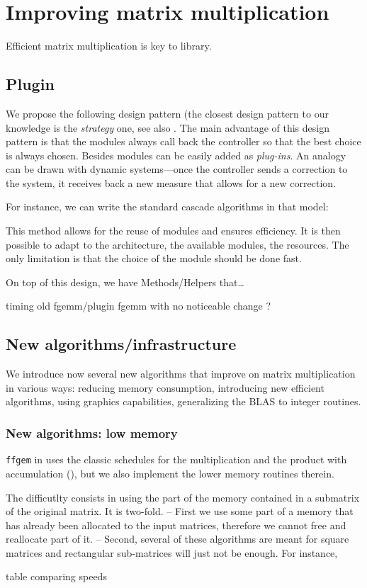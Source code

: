 \section{Improving \linbox matrix multiplication}\label{sec:matmul}
%
Efficient matrix multiplication is key to \linbox library.
%
\subsection{Plugin}
%
We propose the following design pattern (the closest design pattern to our
knowledge is the \emph{strategy} one, see also \cite[Fig 2.]{Cung:2006:TC}.
The main advantage of this design pattern is that the modules always call back
the controller so that the best choice is always chosen.  Besides modules can
be easily added as \emph{plug-ins}.  An analogy can be drawn with dynamic
systems---once the controller sends a correction to the system, it receives
back a new measure that allows for a new correction.
%
\par
%

%
For instance, we can write the standard cascade algorithms in that model:
%
\par
%

%
This method allows for the reuse of modules and ensures efficiency.
It is then possible to adapt to the architecture, the available modules,
the resources. The only limitation is that the choice of the module
should be done fast.
%
\par
%
On top of this design, we have Methods/Helpers that\ldots
%
\par
%
\danger timing old fgemm/plugin fgemm with no noticeable change ?
%
\subsection{New algorithms/infrastructure}
%
We introduce now several new algorithms that improve on matrix multiplication
in various ways: reducing memory consumption, introducing new efficient
algorithms, using graphics capabilities, generalizing the BLAS to integer
routines.
%
\subsubsection{New algorithms: low memory}
%
\texttt{ffgem} in \fflas uses the classic schedules for the multiplication and
the product with accumulation (\cf \cite{Boyer:2009:sched}), but we also
implement the lower memory routines therein.
%
\par
%
The difficutlty consists in using the part of the memory contained in a
submatrix of the original matrix. It is two-fold. -- First we use some part
of a memory that has already been allocated to the input matrices, therefore
we cannot free and reallocate part of it. -- Second, several of these algorithms
are meant for square matrices and rectangular sub-matrices will just not be enough.
For instance,
%
\par
%
\danger table comparing speeds
%
